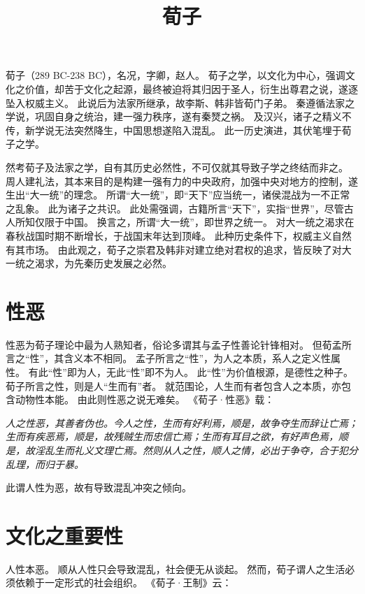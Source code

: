 \documentclass[11pt]{article}
\title{荀子}
\date{}
\begin{document}
  \maketitle

  \linenumbers
  
荀子（289 BC-238 BC），名况，字卿，赵人。
荀子之学，以文化为中心，强调文化之价值，却苦于文化之起源，最终被迫将其归因于圣人，衍生出尊君之说，遂逐坠入权威主义。
此说后为法家所继承，故李斯、韩非皆荀门子弟。
秦遵循法家之学说，巩固自身之统治，建一强力秩序，遂有秦燹之祸。
及汉兴，诸子之精义不传，新学说无法突然降生，中国思想遂陷入混乱。
此一历史演进，其伏笔埋于荀子之学。

\par

然考荀子及法家之学，自有其历史必然性，不可仅就其导致子学之终结而非之。
周人建礼法，其本来目的是构建一强有力的中央政府，加强中央对地方的控制，遂生出“大一统”的理念。
所谓“大一统”，即“天下”应当统一，诸侯混战为一不正常之乱象。
此为诸子之共识。
此处需强调，古籍所言“天下”，实指“世界”，尽管古人所知仅限于中国。
换言之，所谓“大一统”，即世界之统一。
对大一统之渴求在春秋战国时期不断增长，于战国末年达到顶峰。
此种历史条件下，权威主义自然有其市场。
由此观之，荀子之崇君及韩非对建立绝对君权的追求，皆反映了对大一统之渴求，为先秦历史发展之必然。

\section{性恶}
性恶为荀子理论中最为人熟知者，俗论多谓其与孟子性善论针锋相对。
但荀孟所言之“性”，其含义本不相同。
孟子所言之“性”，为人之本质，系人之定义性属性。
有此“性”即为人，无此“性”即不为人。
此“性”为价值根源，是德性之种子。
荀子所言之性，则是人“生而有”者。
就范围论，人生而有者包含人之本质，亦包含动物性本能。
由此则性恶之说无难矣。
《荀子·性恶》载：

\textit{人之性恶，其善者伪也。今人之性，生而有好利焉，顺是，故争夺生而辞让亡焉；生而有疾恶焉，顺是，故残贼生而忠信亡焉；生而有耳目之欲，有好声色焉，顺是，故淫乱生而礼义文理亡焉。然则从人之性，顺人之情，必出于争夺，合于犯分乱理，而归于暴。}

此谓人性为恶，故有导致混乱冲突之倾向。

\section{文化之重要性}
人性本恶。
顺从人性只会导致混乱，社会便无从谈起。
然而，荀子谓人之生活必须依赖于一定形式的社会组织。
《荀子·王制》云：
\end{document}
